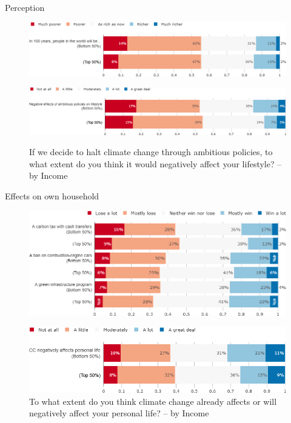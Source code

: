 \begin{framefont}{\small}
\begin{frame}{Perception}%
\vspace{-.5cm}
\begin{figure}[h!]
\caption{Do you think that overall people in the world will be richer or poorer in 100 years from now? -– by Income}
\includegraphics[width=.61\paperwidth]{../figures/FR/future_richness_FR_inc.png} \\
\vspace{.5cm}
\caption{If we decide to halt climate change through ambitious policies, to what extent do you think it would negatively affect your lifestyle? -- by Income}
\includegraphics[width=.61\paperwidth]{../figures/FR/effect_halt_CC_lifestyle_FR_inc.png} \\
\end{figure}
\end{frame}

\begin{frame}{Effects on own household}%
\begin{figure}[h!]
\caption{Do you think that financially your household would win or lose from the following policy? -- by Income}
\includegraphics[width=.52\paperwidth]{../figures/FR/policies_win_lose_self_FR_inc.png} \\
\vspace{.1cm}
\caption{To what extent do you think climate change already affects or will negatively affect your personal life? -- by Income}
\includegraphics[width=.43\paperwidth]{../figures/FR/CC_affects_self_FR_inc.png}
\end{figure}
\end{frame}


\end{framefont}
